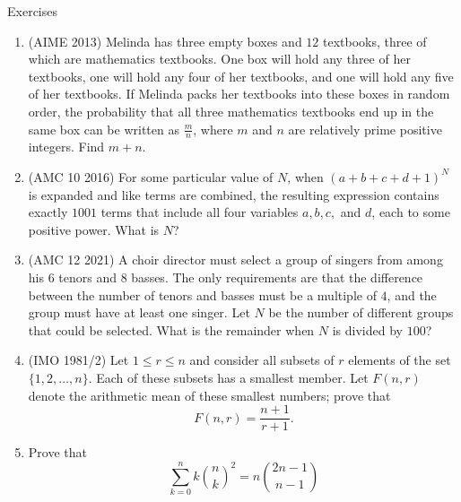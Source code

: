 \begin{xcb}{Exercises}
\begin{enumerate}
\item (AIME 2013)  Melinda has three empty boxes and $12$ textbooks, three of which are mathematics textbooks. One box will hold any three of her textbooks, one will hold any four of her textbooks, and one will hold any five of her textbooks. If Melinda packs her textbooks into these boxes in random order, the probability that all three mathematics textbooks end up in the same box can be written as $\frac{m}{n}$, where $m$ and $n$ are relatively prime positive integers. Find $m+n$.
\begin{hint}
\end{hint}
\item (AMC 10 2016)  For some particular value of $N$, when $(a + b + c + d + 1)^N$ is expanded and like terms are combined, the resulting expression contains exactly $1001$ terms that include all four variables $a, b, c,$ and $d$, each to some positive power. What is $N$?
\item (AMC 12 2021)  A choir director must select a group of singers from among his $6$ tenors and $8$ basses. The only requirements are that the difference between the number of tenors and basses must be a multiple of $4$, and the group must have at least one singer. Let $N$ be the number of different groups that could be selected. What is the remainder when $N$ is divided by $100$?
\begin{hint}
\end{hint}
\item (IMO 1981/2)  Let $\displaystyle 1 \le r \le n$ and consider all subsets of $\displaystyle r$ elements of the set $\{ 1, 2, \ldots , n \}$. Each of these subsets has a smallest member. Let $\displaystyle F(n,r)$ denote the arithmetic mean of these smallest numbers; prove that\\
\[F(n,r) = \frac{n+1}{r+1}.\]
\begin{hint}
\end{hint}
\item {} Prove that \[\sum_{k=0}^n k{\binom{n}{k}}^2=n\binom{2n-1}{n-1}\]
\end{enumerate}
\end{xcb}
